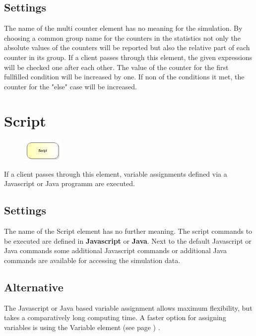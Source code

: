 \subsection*{Settings}

The name of the multi counter element has no meaning for the simulation. By choosing
a common group name for the counters in the statistics not only the absolute values
of the counters will be reported but also the relative part of each counter in its
group. If a client passes through this element, the given expressions will be checked
one after each other. The value of the counter for the first fullfilled condition will
be increased by one. If non of the conditions it met, the counter for the "else" case
will be increased.


\section{Script}
\label{ref:ModelElementSetJS}

\begin{figure}
\vspace{-22pt}
\includegraphics[width=2cm]{imageModelElementSetJS.png}
\vspace{-22pt}
\end{figure}

If a client passes through this element, variable assignments defined via
a Javascript or Java programm are executed.

\subsection*{Settings}

The name of the Script element has no further meaning.
The script commands to be executed are defined in \textbf{Javascript} or \textbf{Java}.
Next to the default Javascript or Java commands some additional Javascript commands 
or additional Java commands are available for accessing the simulation data.

\subsection*{Alternative}

The Javascript or Java based variable assignment allows maximum flexibility, but takes a comparatively long
computing time. A faster option for assigning variables is using the
Variable element (see page \pageref{ref:ModelElementSet}) .


